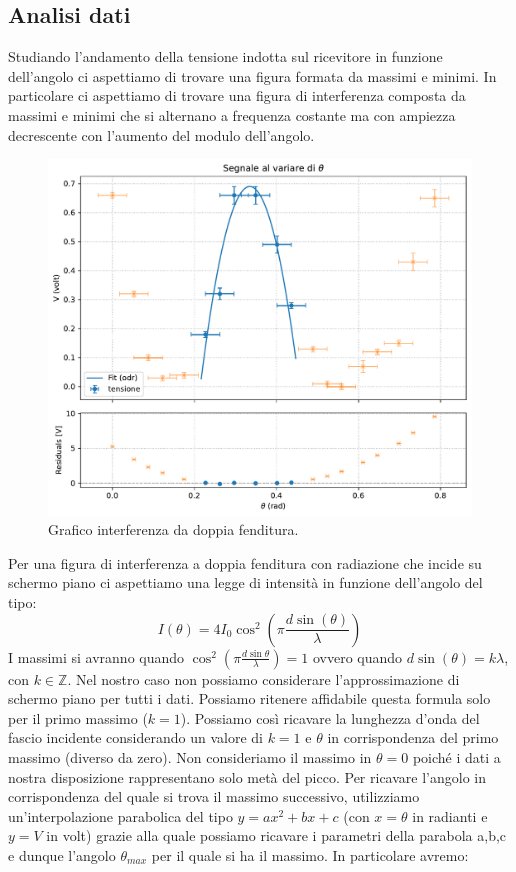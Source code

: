 \documentclass[a4paper]{article}
\begin{document}
\subsection{Analisi dati}
Studiando l'andamento della tensione indotta sul ricevitore in funzione dell'angolo ci aspettiamo di trovare una figura formata da massimi e minimi. In particolare ci aspettiamo di trovare una figura di interferenza composta da massimi e minimi che si alternano a frequenza costante ma con ampiezza decrescente con l'aumento del modulo dell'angolo.
\begin{figure}[H]
    \centering
    \includegraphics[width=0.8\linewidth]{grafici/max_doppiafenditura.pdf}
    \caption{Grafico interferenza da doppia fenditura.}
    \label{fig:grafico_doppia_fenditura}
\end{figure}
Per una figura di interferenza a doppia fenditura con radiazione che incide su schermo piano ci aspettiamo una legge di intensità in funzione dell'angolo del tipo: 
\begin{equation}
    I(\theta)=4I_0\cos^2\left(\pi\frac{d \sin(\theta)}{\lambda}\right)
    \label{eq:doppia_fenditura_intensita}
\end{equation}
I massimi si avranno quando $\cos^2\left(\pi\frac{d\sin\theta}{\lambda}\right)=1$ ovvero quando $d\sin(\theta)=k\lambda$, con $k \in \mathbb{Z}$. Nel nostro caso non possiamo considerare l'approssimazione di schermo piano per tutti i dati. Possiamo ritenere affidabile questa formula solo per il primo massimo ($k=1$). Possiamo così ricavare la lunghezza d'onda del fascio incidente considerando un valore di $k=1$ e $\theta$ in corrispondenza del primo massimo (diverso da zero).
Non consideriamo il massimo in $\theta=0$ poiché i dati a nostra disposizione rappresentano solo metà del picco. Per ricavare l'angolo in corrispondenza del quale si trova il massimo successivo, utilizziamo un'interpolazione parabolica del tipo $y=ax^2+bx+c$ (con $x=\theta$ in radianti e $y=V$ in volt) grazie alla quale possiamo ricavare i parametri della parabola a,b,c e dunque l'angolo $\theta_{max}$ per il quale si ha il massimo. In particolare avremo:
\end{document}
